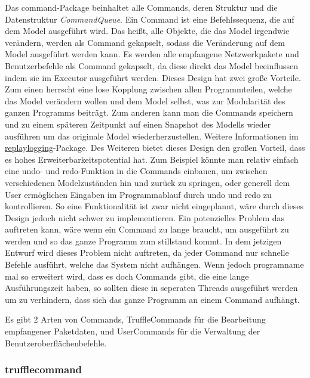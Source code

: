 \medskip
Das command-Package beinhaltet alle Commands, deren Struktur und die Datenstruktur
\textit{CommandQueue}. Ein Command ist eine Befehlssequenz, die auf
dem Model ausgeführt wird. Das heißt, alle Objekte, die das Model irgendwie verändern,
werden als Command gekapselt, sodass die Veränderung auf dem Model
ausgeführt werden kann. Es werden alle empfangene Netzwerkpakete
und Benutzerbefehle als Command gekapselt, da diese direkt das Model beeinflussen
indem sie im Executor ausgeführt werden.
\newline
\newline
Dieses Design hat zwei große Vorteile. Zum einen herrscht eine lose Kopplung zwischen
allen Programmteilen, welche das Model verändern wollen und dem Model selbst, was zur Modularität des ganzen
Programms beiträgt. Zum anderen kann man die Commands speichern und zu einem
späteren Zeitpunkt auf einen Snapshot des Modells wieder ausführen um das originale
Model wiederherzustellen. Weitere Informationen im
\hyperref[subsubsec:replaylogging]{replaylogging}-Package. Des Weiteren bietet dieses
Design den großen Vorteil, dass es hohes Erweiterbarkeitspotential hat. Zum Beispiel
könnte man relativ einfach eine undo- und redo-Funktion in die Commands einbauen, um
zwischen verschiedenen Modelzuständen hin und zurück zu springen, oder generell dem User ermöglichen Eingaben im Programmablauf durch undo und redo zu kontrollieren. So eine
Funktionalität ist zwar nicht eingeplannt, wäre durch dieses Design jedoch nicht schwer zu implementieren.
\newline
\newline
Ein potenzielles Problem das auftreten kann, wäre wenn ein Command zu lange braucht, um
ausgeführt zu werden und so das ganze Programm zum stillstand kommt.
In dem jetzigen Entwurf wird dieses Problem nicht auftreten, da jeder Command
nur schnelle Befehle ausführt, welche das System nicht
aufhängen. Wenn jedoch \gls{programname} mal so erweitert wird, dass es doch Commands gibt,
die eine lange Ausführungszeit haben, so sollten diese in seperaten Threads
ausgeführt werden um zu verhindern, dass sich das ganze Programm an einem Command
aufhängt.

Es gibt 2 Arten von Commands, TruffleCommands für die Bearbeitung empfangener
Paketdaten, und UserCommands für die Verwaltung der Benutzeroberflächenbefehle.

      \subsubsection{trufflecommand}
      \label{subsubsec:trufflecommand}

